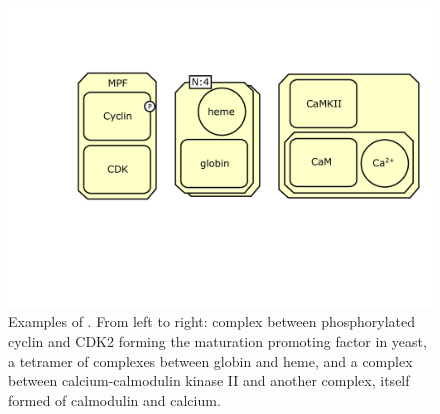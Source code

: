 \begin{figure}[H]
  \centering
  \includegraphics[scale = 0.5]{images/complex-examples}
  \caption{Examples of . From left to right: complex between phosphorylated cyclin and CDK2 forming the maturation promoting factor in yeast, a tetramer of complexes between globin and heme, and a complex between calcium-calmodulin kinase II and another complex, itself formed of calmodulin and calcium.}
  \label{fig:complex-examples}
\end{figure}
